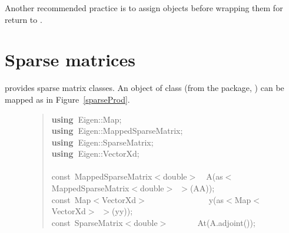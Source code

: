 \documentclass[shortnames,article]{jss}
\newcommand{\hlstd}[1]{\textcolor[rgb]{0,0,0}{#1}}
\newcommand{\hlopt}[1]{\textcolor[rgb]{0,0,0}{#1}}
\newcommand{\hlkwa}[1]{\textcolor[rgb]{0.61,0.13,0.93}{\bf{#1}}}
\newcommand{\hlkwb}[1]{\textcolor[rgb]{0.13,0.54,0.13}{#1}}
\newcommand{\hlkwd}[1]{\textcolor[rgb]{0,0,0}{#1}}
\begin{document}
Another recommended practice is to assign objects before wrapping them
for return to .

\section{Sparse matrices}
\label{sec:sparse}

 provides sparse matrix classes.  An  object of
class  (from the  package, \citep{CRAN:Matrix}) can be mapped as in Figure~\ref{sparseProd}.

\begin{figure}[htb]
  \begin{quote}
    \noindent
    \ttfamily
    \hlstd{}\hlkwa{using\ }\hlstd{Eigen}\hlopt{::}\hlstd{Map}\hlopt{;}\hspace*{\fill}\\
    \hlstd{}\hlkwa{using\ }\hlstd{Eigen}\hlopt{::}\hlstd{MappedSparseMatrix}\hlopt{;}\hspace*{\fill}\\
    \hlstd{}\hlkwa{using\ }\hlstd{Eigen}\hlopt{::}\hlstd{SparseMatrix}\hlopt{;}\hspace*{\fill}\\
    \hlstd{}\hlkwa{using\ }\hlstd{Eigen}\hlopt{::}\hlstd{VectorXd}\hlopt{;}\hspace*{\fill}\\
    \hlstd{}\hspace*{\fill}\\
    \hlkwb{const\ }\hlstd{MappedSparseMatrix}\hlopt{$<$}\hlstd{}\hlkwb{double}\hlstd{}\hlopt{$>$}\hlstd{\ \ }\hlopt{}\hlstd{}\hlkwd{A}\hlstd{}\hlopt{(}\hlstd{as}\hlopt{$<$}\hlstd{MappedSparseMatrix}\hlopt{$<$}\hlstd{}\hlkwb{double}\hlstd{}\hlopt{$>$\ $>$(}\hlstd{AA}\hlopt{));}\hspace*{\fill}\\
    \hlstd{}\hlkwb{const\ }\hlstd{Map}\hlopt{$<$}\hlstd{VectorXd}\hlopt{$>$}\hlstd{\ \ \ \ \ \ \ \ \ \ \ \ \ \ \ }\hlopt{}\hlstd{}\hlkwd{y}\hlstd{}\hlopt{(}\hlstd{as}\hlopt{$<$}\hlstd{Map}\hlopt{$<$}\hlstd{VectorXd}\hlopt{$>$\ $>$(}\hlstd{yy}\hlopt{));}\hspace*{\fill}\\
    \hlstd{}\hlkwb{const\ }\hlstd{SparseMatrix}\hlopt{$<$}\hlstd{}\hlkwb{double}\hlstd{}\hlopt{$>$}\hlstd{\ \ \ \ \ \ \ }\hlopt{}\hlstd{}\hlkwd{At}\hlstd{}\hlopt{(}\hlstd{A}\hlopt{.}\hlstd{}\hlkwd{adjoint}\hlstd{}\hlopt{());}\hspace*{\fill}\\

\end{quote}
\end{figure}
\end{document}
